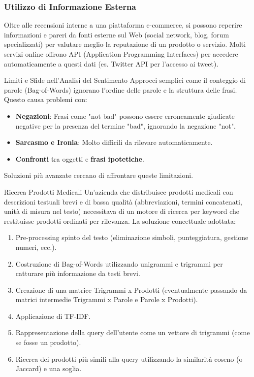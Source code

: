 \documentclass{article}
\begin{document}
\subsubsection{Utilizzo di Informazione Esterna}
Oltre alle recensioni interne a una piattaforma e-commerce, si possono reperire informazioni e pareri da fonti esterne sul Web (social network, blog, forum specializzati) per valutare meglio la reputazione di un prodotto o servizio. Molti servizi online offrono API (Application Programming Interfaces) per accedere automaticamente a questi dati (es. Twitter API per l'accesso ai tweet).

\begin{notebox}{Limiti e Sfide nell'Analisi del Sentimento}
    Approcci semplici come il conteggio di parole (Bag-of-Words) ignorano l'ordine delle parole e la struttura delle frasi. Questo causa problemi con:
    \begin{itemize}
        \item \textbf{Negazioni}: Frasi come "not bad" possono essere erroneamente giudicate negative per la presenza del termine "bad", ignorando la negazione "not".
        \item \textbf{Sarcasmo e Ironia}: Molto difficili da rilevare automaticamente.
        \item \textbf{Confronti} tra oggetti e \textbf{frasi ipotetiche}.
    \end{itemize}
    Soluzioni più avanzate cercano di affrontare queste limitazioni.
\end{notebox}

\begin{examplebox}{Ricerca Prodotti Medicali}
    Un'azienda che distribuisce prodotti medicali con descrizioni testuali brevi e di bassa qualità (abbreviazioni, termini concatenati, unità di misura nel testo) necessitava di un motore di ricerca per keyword che restituisse prodotti ordinati per rilevanza.
    La soluzione concettuale adottata:
    \begin{enumerate}
        \item Pre-processing spinto del testo (eliminazione simboli, punteggiatura, gestione numeri, ecc.).
        \item Costruzione di Bag-of-Words utilizzando unigrammi e trigrammi per catturare più informazione da testi brevi.
        \item Creazione di una matrice Trigrammi x Prodotti (eventualmente passando da matrici intermedie Trigrammi x Parole e Parole x Prodotti).
        \item Applicazione di TF-IDF.
        \item Rappresentazione della query dell'utente come un vettore di trigrammi (come se fosse un prodotto).
        \item Ricerca dei prodotti più simili alla query utilizzando la similarità coseno (o Jaccard) e una soglia.
    \end{enumerate}
\end{examplebox}

\end{document}
